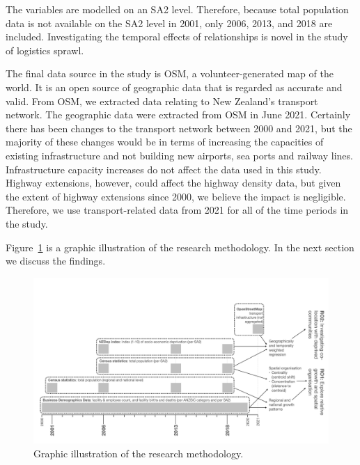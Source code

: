 \documentclass[3p, a4paper, authoryear, 11pt, fleqn, review]{elsarticle}
\newcommand{\nmt}[1]{{\color{ForestGreen}{~(nmt: #1)}}}
\begin{document}
The variables are modelled on an \ac{SA2} level. Therefore, because total population data is not available on the \ac{SA2} level in 2001, only 2006, 2013, and 2018 are included. Investigating the temporal effects of relationships is novel in the study of logistics sprawl. \nmt{Insert quick recap of literature to prove}


The final data source in the study is \ac{OSM}, a volunteer-generated map of the world. It is an open source of geographic data that is regarded as accurate and valid. From \ac{OSM}, we extracted data relating to New Zealand's transport network. The geographic data were extracted from \ac{OSM} in June 2021. Certainly there has been changes to the transport network between 2000 and 2021, but the majority of these changes would be in terms of increasing the capacities of existing infrastructure and not building new airports, sea ports and railway lines. Infrastructure capacity increases do not affect the data used in this study. Highway extensions, however, could affect the highway density data, but given the extent of highway extensions since 2000, we believe the impact is negligible.\nmt{I still have to substantiate this somehow.} Therefore, we use transport-related data from 2021 for all of the time periods in the study.

Figure~\ref{fig:method} is a graphic illustration of the research methodology. In the next section we discuss the findings.  

\begin{figure}[h!]
    \centering
    \includegraphics[width=0.9\linewidth]{methodology.jpeg}
    \caption{Graphic illustration of the research methodology.\nmt{remove birth and death stats - don't have for all industries}}
    \label{fig:method}
\end{figure}

\end{document}
